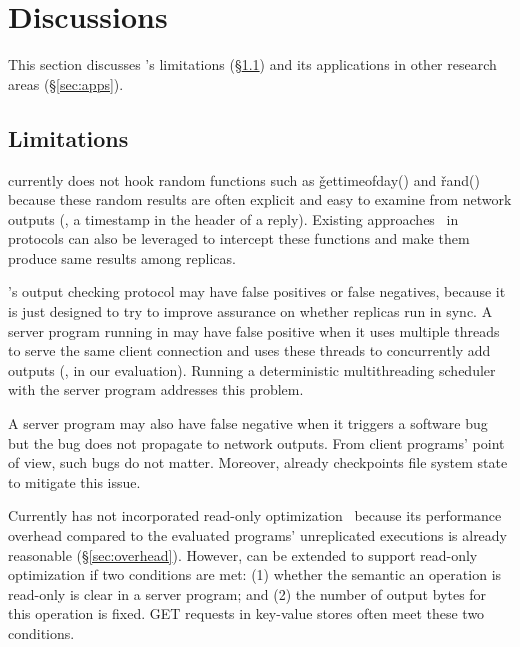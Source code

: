 \section{Discussions}\label{sec:discuss}
% 
This section discusses \xxx's limitations (\S\ref{sec:limits}) and its 
applications in other research areas (\S\ref{sec:apps}).

\subsection{Limitations}\label{sec:limits}


\xxx currently does not hook random functions such as \v{gettimeofday()} and 
\v{rand()} because these random results are often explicit and easy to examine 
from network outputs (\eg, a timestamp in the header of a reply). Existing 
approaches~\cite{eve:osdi12,paxos:practical} in \paxos protocols can also be 
leveraged to intercept these functions and make them produce same results among 
replicas.


\xxx's output checking protocol may have false positives or false negatives, 
because it is just designed to try to improve assurance on whether replicas run 
in sync. A server program running in \xxx may have false positive when it uses 
multiple threads to serve the same client connection and uses these threads to 
concurrently add outputs (\eg, \clamav in our evaluation). 
Running a deterministic multithreading 
scheduler~\cite{coredet:asplos10,parrot:sosp13} with the server program 
addresses this problem.

A server program may also have false negative when it triggers a software bug 
but the bug does not propagate to network outputs. From client programs' point 
of view, such bugs do not matter. Moreover, \xxx already checkpoints file 
system state to mitigate this issue.

Currently \xxx has not incorporated read-only optimization~\cite{eve:osdi12} 
because its performance overhead compared to the evaluated programs' 
unreplicated executions is already reasonable (\S\ref{sec:overhead}). However, 
\xxx can be extended to support read-only optimization if two conditions are 
met: (1) whether the semantic an operation is read-only is clear in a server 
program; and (2) the number of output bytes for this operation is fixed. GET 
requests in key-value stores often meet these two conditions.

